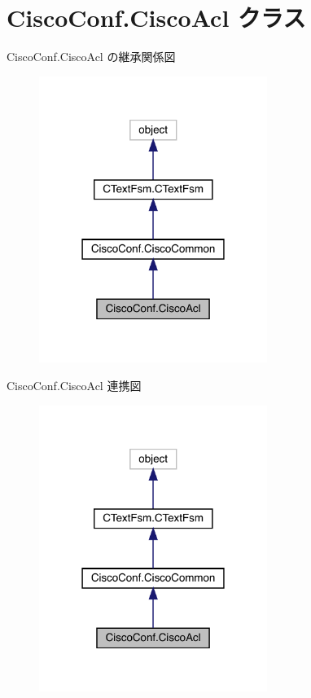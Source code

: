 \hypertarget{classCiscoConf_1_1CiscoAcl}{}\section{Cisco\+Conf.\+Cisco\+Acl クラス}
\label{classCiscoConf_1_1CiscoAcl}


Cisco\+Conf.\+Cisco\+Acl の継承関係図
\nopagebreak
\begin{figure}[H]
\begin{center}
\leavevmode
\includegraphics[width=210pt]{classCiscoConf_1_1CiscoAcl__inherit__graph}
\end{center}
\end{figure}


Cisco\+Conf.\+Cisco\+Acl 連携図
\nopagebreak
\begin{figure}[H]
\begin{center}
\leavevmode
\includegraphics[width=210pt]{classCiscoConf_1_1CiscoAcl__coll__graph}
\end{center}
\end{figure}
